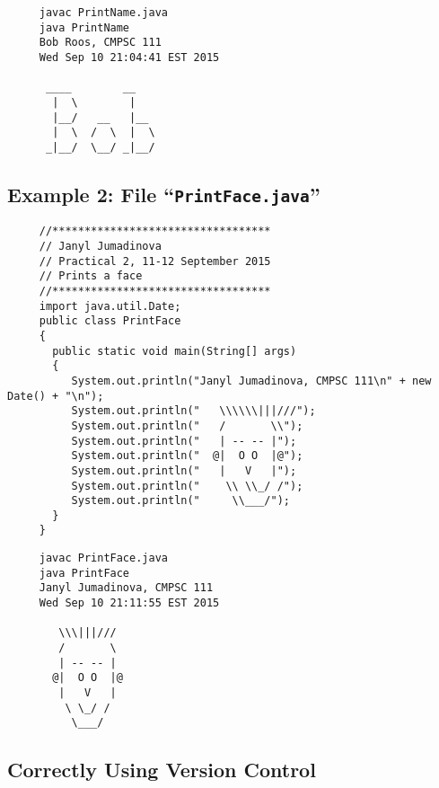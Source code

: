 \begin{verbatim}
     javac PrintName.java
     java PrintName
     Bob Roos, CMPSC 111
     Wed Sep 10 21:04:41 EST 2015

      ____        __
       |  \        |
       |__/   __   |__
       |  \  /  \  |  \
      _|__/  \__/ _|__/
\end{verbatim}

\newpage

\subsection*{Example 2: File ``{\tt PrintFace.java}''}
\begin{verbatim}
     //**********************************
     // Janyl Jumadinova
     // Practical 2, 11-12 September 2015
     // Prints a face
     //**********************************
     import java.util.Date;
     public class PrintFace
     {
       public static void main(String[] args)
       {
          System.out.println("Janyl Jumadinova, CMPSC 111\n" + new Date() + "\n");
          System.out.println("   \\\\\\|||///");
          System.out.println("   /       \\");
          System.out.println("   | -- -- |");
          System.out.println("  @|  O O  |@");
          System.out.println("   |   V   |");
          System.out.println("    \\ \\_/ /");
          System.out.println("     \\___/");
       }
     }
\end{verbatim}
\begin{verbatim}
     javac PrintFace.java
     java PrintFace
     Janyl Jumadinova, CMPSC 111
     Wed Sep 10 21:11:55 EST 2015

        \\\|||///
        /       \
        | -- -- |
       @|  O O  |@
        |   V   |
         \ \_/ /
          \___/
\end{verbatim}

\subsection*{Correctly Using Version Control}

